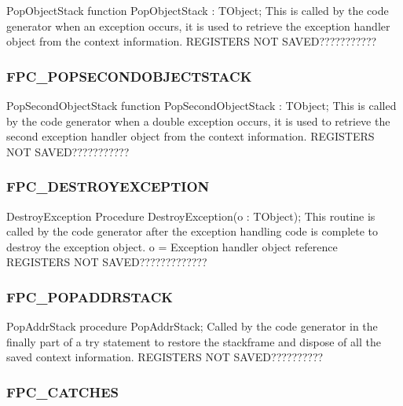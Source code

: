 \documentclass [a4paper,12pt]{article}
\begin{document}
\begin{function}{PopObjectStack}
\Declaration
function PopObjectStack : TObject;
\Description
This is called by the code generator when an exception occurs, it is used to
retrieve the exception handler object from the context information.
\Notes
REGISTERS NOT SAVED???????????
\end{function}

\subsubsection{FPC{\_}POPSECONDOBJECTSTACK}
\label{subsubsec:mylabel64}

\begin{function}{PopSecondObjectStack}
\Declaration
function PopSecondObjectStack : TObject;
\Description
This is called by the code generator when a double exception occurs, it is
used to retrieve the second exception handler object from the context
information.
\Notes
REGISTERS NOT SAVED???????????
\end{function}

\subsubsection{FPC{\_}DESTROYEXCEPTION}
\label{subsubsec:mylabel65}

\begin{procedure}{DestroyException}
\Declaration
Procedure DestroyException(o : TObject);
\Description
This routine is called by the code generator after the exception handling
code is complete to destroy the exception object.
\Parameters 
o = Exception handler object reference
\Notes
REGISTERS NOT SAVED?????????????
\end{procedure}

\subsubsection{FPC{\_}POPADDRSTACK}
\label{subsubsec:mylabel66}

\begin{procedure}{PopAddrStack}
\Declaration
procedure PopAddrStack;
\Description
Called by the code generator in the finally part of a try statement to
restore the stackframe and dispose of all the saved context information.
\Notes
REGISTERS NOT SAVED??????????
\end{procedure}

\subsubsection{FPC{\_}CATCHES}
\label{subsubsec:mylabel67}
\end{document}
